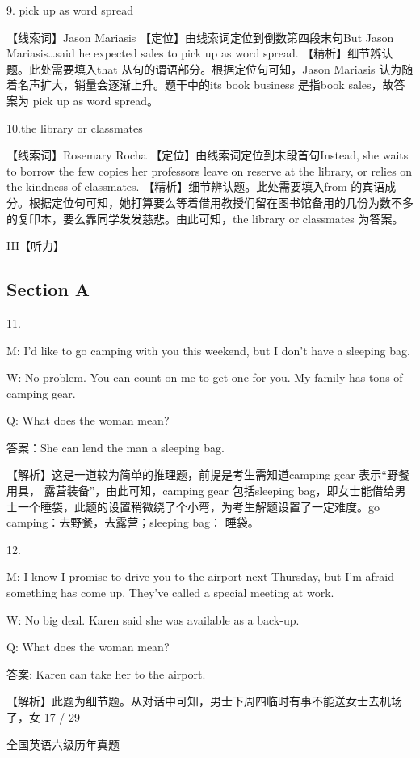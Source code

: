 \documentclass[UTF8,11pt]{ctexart}
\begin{document}
9. pick up as word spread


【线索词】Jason Mariasis 【定位】由线索词定位到倒数第四段末句But Jason Mariasis…said he expected sales to pick up as word spread. 【精析】细节辨认题。此处需要填入that 从句的谓语部分。根据定位句可知，Jason Mariasis 认为随着名声扩大，销量会逐渐上升。题干中的its book business 是指book sales，故答案为 pick up as word spread。


10.the library or classmates


【线索词】Rosemary Rocha 【定位】由线索词定位到末段首句Instead, she waits to borrow the few copies her professors leave on reserve at the library, or relies on the kindness of classmates. 【精析】细节辨认题。此处需要填入from 的宾语成分。根据定位句可知，她打算要么等着借用教授们留在图书馆备用的几份为数不多的复印本，要么靠同学发发慈悲。由此可知，the library or classmates 为答案。


III【听力】


\subsection*{Section A}


11.


M: I’d like to go camping with you this weekend, but I don’t have a sleeping bag.


W: No problem. You can count on me to get one for you. My family has tons of camping gear.


Q: What does the woman mean?


答案：She can lend the man a sleeping bag.


【解析】这是一道较为简单的推理题，前提是考生需知道camping gear 表示“野餐用具， 露营装备”，由此可知，camping gear 包括sleeping bag，即女士能借给男士一个睡袋，此题的设置稍微绕了个小弯，为考生解题设置了一定难度。go camping：去野餐，去露营；sleeping bag： 睡袋。


12.


M: I know I promise to drive you to the airport next Thursday, but I’m afraid something has come up. They’ve called a special meeting at work.


W: No big deal. Karen said she was available as a back-up.


Q: What does the woman mean?


答案: Karen can take her to the airport.


【解析】此题为细节题。从对话中可知，男士下周四临时有事不能送女士去机场了，女 17 / 29


全国英语六级历年真题
\end{document}

